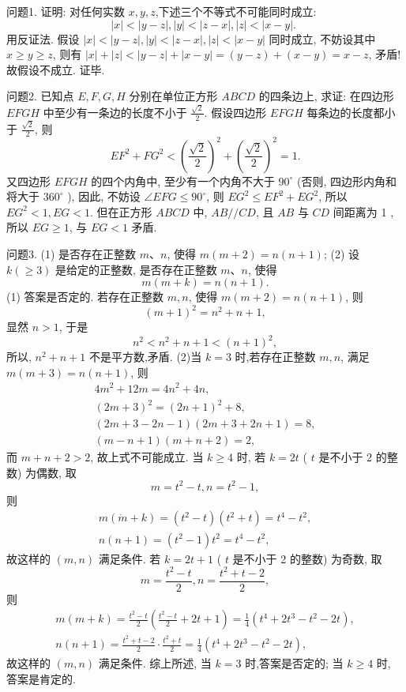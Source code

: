 
问题1. 证明: 对任何实数 $x, y, z$,下述三个不等式不可能同时成立:
$$
|x|<|y-z|,|y|<|z-x|,|z|<|x-y| \text {. }
$$
用反证法.
假设 $|x|<|y-z|,|y|<|z-x|,|z|<|x-y|$ 同时成立, 不妨设其中 $x \geqslant y \geqslant z$, 则有 $|x|+|z|<|y-z|+|x-y|= (y-z)+(x-y)=x-z$, 矛盾! 故假设不成立.
证毕.



问题2. 已知点 $E, F, G, H$ 分别在单位正方形 $A B C D$ 的四条边上, 求证: 在四边形 $E F G H$ 中至少有一条边的长度不小于 $\frac{\sqrt{2}}{2}$.
假设四边形 $E F G H$ 每条边的长度都小于 $\frac{\sqrt{2}}{2}$, 则
$$
E F^2+F G^2<\left(\frac{\sqrt{2}}{2}\right)^2+\left(\frac{\sqrt{2}}{2}\right)^2=1 .
$$
又四边形 $E F G H$ 的四个内角中, 至少有一个内角不大于 $90^{\circ}$ (否则, 四边形内角和将大于 $360^{\circ}$ ), 因此, 不妨设 $\angle E F G \leqslant 90^{\circ}$, 则 $E G^2 \leqslant E F^2+E G^2$, 所以 $E G^2<1, E G<1$. 但在正方形 $A B C D$ 中, $A B / / C D$, 且 $A B$ 与 $C D$ 间距离为 1 , 所以 $E G \geqslant 1$, 与 $E G<1$ 矛盾.



问题3. (1) 是否存在正整数 $m 、 n$, 使得 $m(m+2)=n(n+1)$;
(2) 设 $k(\geqslant 3)$ 是给定的正整数, 是否存在正整数 $m 、 n$, 使得
$$
m(m+k)=n(n+1) .
$$
(1) 答案是否定的.
若存在正整数 $m, n$, 使得 $m(m+2)=n(n+1)$, 则
$$
(m+1)^2=n^2+n+1,
$$
显然 $n>1$, 于是
$$
n^2<n^2+n+1<(n+1)^2,
$$
所以, $n^2+n+1$ 不是平方数,矛盾.
(2)当 $k=3$ 时,若存在正整数 $m, n$, 满足 $m(m+3)=n(n+1)$, 则
$$
\begin{gathered}
4 m^2+12 m=4 n^2+4 n, \\
(2 m+3)^2=(2 n+1)^2+8, \\
(2 m+3-2 n-1)(2 m+3+2 n+1)=8, \\
(m-n+1)(m+n+2)=2,
\end{gathered}
$$
而 $m+n+2>2$, 故上式不可能成立.
当 $k \geqslant 4$ 时, 若 $k=2 t$ ( $t$ 是不小于 2 的整数) 为偶数, 取
$$
m=t^2-t, n=t^2-1,
$$
则
$$
\begin{gathered}
m(\dot{m}+k)=\left(t^2-t\right)\left(t^2+t\right)=t^4-t^2, \\
n(n+1)=\left(t^2-1\right) t^2=t^4-t^2,
\end{gathered}
$$
故这样的 $(m, n)$ 满足条件.
若 $k=2 t+1$ ( $t$ 是不小于 2 的整数) 为奇数, 取
$$
m=\frac{t^2-t}{2}, n=\frac{t^2+t-2}{2},
$$
则
$$
\begin{gathered}
m(m+k)=\frac{t^2-t}{2}\left(\frac{t^2-t}{2}+2 t+1\right)=\frac{1}{4}\left(t^4+2 t^3-t^2-2 t\right), \\
n(n+1)=\frac{t^2+t-2}{2} \cdot \frac{t^2+t}{2}=\frac{1}{4}\left(t^4+2 t^3-t^2-2 t\right),
\end{gathered}
$$
故这样的 $(m, n)$ 满足条件.
综上所述, 当 $k=3$ 时,答案是否定的; 当 $k \geqslant 4$ 时, 答案是肯定的.



